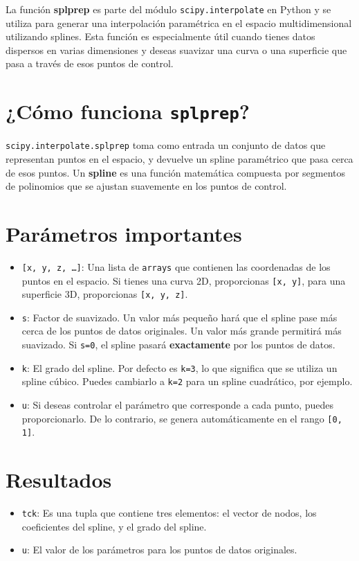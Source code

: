 La función \textbf{splprep} es parte del módulo \texttt{scipy.interpolate} en 
Python y se utiliza para generar una interpolación paramétrica en el espacio 
multidimensional utilizando splines. Esta función es especialmente útil cuando 
tienes datos dispersos en varias dimensiones y deseas suavizar una curva o una 
superficie que pasa a través de esos puntos de control.

\section*{¿Cómo funciona \texttt{splprep}?}
\texttt{scipy.interpolate.splprep} toma como entrada un conjunto de datos que 
representan puntos en el espacio, y devuelve un spline paramétrico que pasa cerca 
de esos puntos. Un \textbf{spline} es una función matemática compuesta por 
segmentos de polinomios que se ajustan suavemente en los puntos de control.

\section*{Parámetros importantes}

\begin{itemize}
    \item \texttt{[x, y, z, \ldots]}: Una lista de \texttt{arrays} que contienen 
    las coordenadas de los puntos en el espacio. Si tienes una curva 2D, proporcionas 
    \texttt{[x, y]}, para una superficie 3D, proporcionas \texttt{[x, y, z]}.
    \item \texttt{s}: Factor de suavizado. Un valor más pequeño hará que el spline 
    pase más cerca de los puntos de datos originales. Un valor más grande permitirá 
    más suavizado. Si \texttt{s=0}, el spline pasará \textbf{exactamente} por los 
    puntos de datos.
    \item \texttt{k}: El grado del spline. Por defecto es \texttt{k=3}, lo que 
    significa que se utiliza un spline cúbico. Puedes cambiarlo a \texttt{k=2} para 
    un spline cuadrático, por ejemplo.
    \item \texttt{u}: Si deseas controlar el parámetro que corresponde a cada punto, 
    puedes proporcionarlo. De lo contrario, se genera automáticamente en el rango 
    \texttt{[0, 1]}.
\end{itemize}

\section*{Resultados}

\begin{itemize}
    \item \texttt{tck}: Es una tupla que contiene tres elementos: el vector de nodos, 
    los coeficientes del spline, y el grado del spline.
    \item \texttt{u}: El valor de los parámetros para los puntos de datos originales.
\end{itemize}